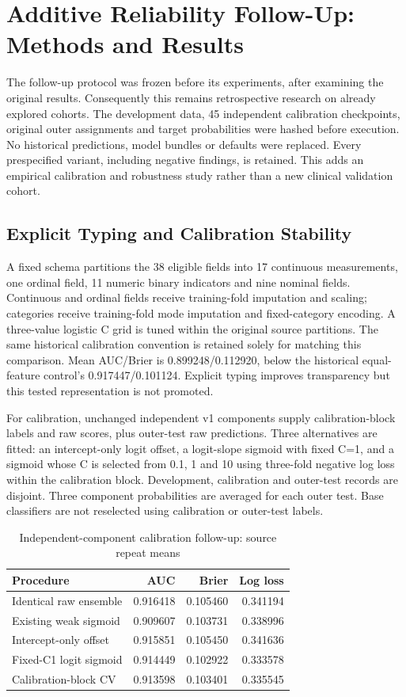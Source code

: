 \documentclass[conference]{IEEEtran}
\begin{document}
\setcounter{table}{4}
\section{Additive Reliability Follow-Up: Methods and Results}
The follow-up protocol was frozen before its experiments, after examining the original results. Consequently this remains retrospective research on already explored cohorts. The development data, 45 independent calibration checkpoints, original outer assignments and target probabilities were hashed before execution. No historical predictions, model bundles or defaults were replaced. Every prespecified variant, including negative findings, is retained. This adds an empirical calibration and robustness study rather than a new clinical validation cohort.

\subsection{Explicit Typing and Calibration Stability}
A fixed schema partitions the 38 eligible fields into 17 continuous measurements, one ordinal field, 11 numeric binary indicators and nine nominal fields. Continuous and ordinal fields receive training-fold imputation and scaling; categories receive training-fold mode imputation and fixed-category encoding. A three-value logistic C grid is tuned within the original source partitions. The same historical calibration convention is retained solely for matching this comparison. Mean AUC/Brier is 0.899248/0.112920, below the historical equal-feature control's 0.917447/0.101124. Explicit typing improves transparency but this tested representation is not promoted.

For calibration, unchanged independent v1 components supply calibration-block labels and raw scores, plus outer-test raw predictions. Three alternatives are fitted: an intercept-only logit offset, a logit-slope sigmoid with fixed C=1, and a sigmoid whose C is selected from 0.1, 1 and 10 using three-fold negative log loss within the calibration block. Development, calibration and outer-test records are disjoint. Three component probabilities are averaged for each outer test. Base classifiers are not reselected using calibration or outer-test labels.

\begin{table}[htbp]
\centering\caption{Independent-component calibration follow-up: source repeat means}
\small\begin{tabular}{lrrr}\toprule
Procedure & AUC & Brier & Log loss\\\midrule
Identical raw ensemble & 0.916418 & 0.105460 & 0.341194\\
Existing weak sigmoid & 0.909607 & 0.103731 & 0.338996\\
Intercept-only offset & 0.915851 & 0.105450 & 0.341636\\
Fixed-C1 logit sigmoid & 0.914449 & 0.102922 & 0.333578\\
Calibration-block CV & 0.913598 & 0.103401 & 0.335545\\\bottomrule
\end{tabular}\end{table}
\end{document}
